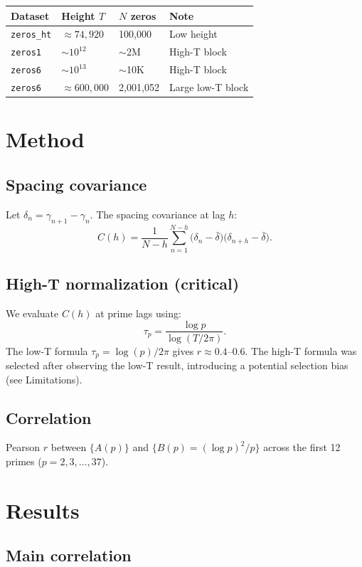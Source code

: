 \documentclass[11pt]{article}
\begin{document}
\begin{center}
\begin{tabular}{llll}
\toprule
Dataset & Height $T$ & $N$ zeros & Note \\
\midrule
\texttt{zeros\_ht} & $\approx 74{,}920$ & 100,000 & Low height \\
\texttt{zeros1} & $\sim 10^{12}$     & $\sim$2M & High-T block \\
\texttt{zeros6} & $\sim 10^{13}$     & $\sim$10K & High-T block \\
\texttt{zeros6} & $\approx 600{,}000$ & 2,001,052 & Large low-T block \\
\bottomrule
\end{tabular}
\end{center}

\section{Method}

\subsection{Spacing covariance}
Let $\delta_n = \gamma_{n+1} - \gamma_n$. The spacing covariance at lag $h$:
\[
  C(h) = \frac{1}{N-h}\sum_{n=1}^{N-h}
  \bigl(\delta_n - \bar\delta\bigr)\bigl(\delta_{n+h} - \bar\delta\bigr).
\]

\subsection{High-T normalization (critical)}
We evaluate $C(h)$ at prime lags using:
\[
  \tau_p = \frac{\log p}{\log(T/2\pi)}.
\]
The low-T formula $\tau_p = \log(p)/2\pi$ gives $r \approx 0.4$--$0.6$.
The high-T formula was selected after observing the low-T result,
introducing a potential selection bias (see Limitations).

\subsection{Correlation}
Pearson $r$ between $\{A(p)\}$ and $\{B(p) = (\log p)^2/p\}$
across the first 12 primes ($p = 2,3,\ldots,37$).

\section{Results}

\subsection{Main correlation}
\end{document}
